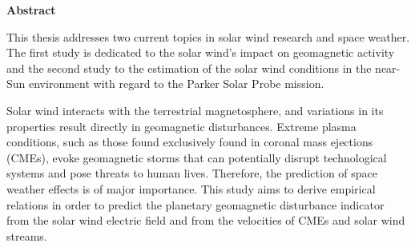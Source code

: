 \cleardoublepage

\begin{titlepage}
 
\end{titlepage}

\begin{center}
	{\LARGE \sffamily \textbf{Abstract}}	%
\end{center}
This thesis addresses two current topics in solar wind research and space weather. The first study is dedicated to the solar wind's impact on geomagnetic activity and the second study to the estimation of the solar wind conditions in the near-Sun environment with regard to the Parker Solar Probe mission.

\medskip

Solar wind interacts with the terrestrial magnetosphere, and variations in its properties result directly in geomagnetic disturbances. Extreme plasma conditions, such as those found exclusively found in coronal mass ejections (CMEs), evoke geomagnetic storms that can potentially disrupt technological systems and pose threats to human lives. Therefore, the prediction of space weather effects is of major importance.
This study aims to derive empirical relations in order to predict the planetary geomagnetic disturbance indicator \Kp{} from the solar wind electric field and from the velocities of CMEs and solar wind streams.

